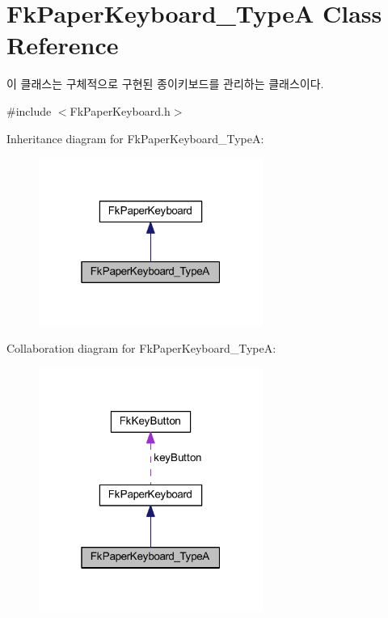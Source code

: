 \hypertarget{class_fk_paper_keyboard___type_a}{}\section{Fk\+Paper\+Keyboard\+\_\+\+Type\+A Class Reference}
\label{class_fk_paper_keyboard___type_a}


이 클래스는 구체적으로 구현된 종이키보드를 관리하는 클래스이다.  




{\ttfamily \#include $<$Fk\+Paper\+Keyboard.\+h$>$}



Inheritance diagram for Fk\+Paper\+Keyboard\+\_\+\+Type\+A\+:\nopagebreak
\begin{figure}[H]
\begin{center}
\leavevmode
\includegraphics[width=208pt]{class_fk_paper_keyboard___type_a__inherit__graph}
\end{center}
\end{figure}


Collaboration diagram for Fk\+Paper\+Keyboard\+\_\+\+Type\+A\+:\nopagebreak
\begin{figure}[H]
\begin{center}
\leavevmode
\includegraphics[width=208pt]{class_fk_paper_keyboard___type_a__coll__graph}
\end{center}
\end{figure}
